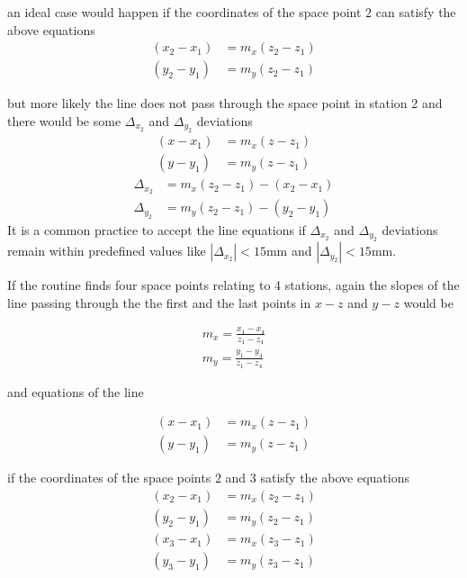 an ideal case would happen if the coordinates of the space
point $2$ can satisfy the above equations
\begin{equation}
\begin{split}
(x_{2}-x_{1}) &=m_{x}(z_{2}-z_{1})\\
(y_{2}-y_{1}) &=m_{y}(z_{2}-z_{1})
\end{split}
\end{equation}

but more likely the line does not pass through the space point in station 2
and there would be some $\Delta_{x_2}$ and $\Delta_{y_2}$ deviations
\begin{equation}
\begin{split}
(x-x_{1}) &=m_{x}(z-z_{1})\\
(y-y_{1}) &=m_{y}(z-z_{1})
\end{split}
\end{equation}
\begin{equation}
\begin{split}
\Delta_{x_2} &=m_{x}(z_{2}-z_{1})-(x_{2}-x_{1})\\
\Delta_{y_2} &=m_{y}(z_{2}-z_{1})-(y_{2}-y_{1})
\end{split}
\end{equation}
It is a common practice to accept the line equations if
$\Delta_{x_2}$ and $\Delta_{y_2}$ deviations  remain within  
 predefined values like 
$|\Delta_{x_2}|< 15 \text{mm}$  and  $|\Delta_{y_2}|<15 \text{mm}$.
 
If the routine finds four space points relating to 4 stations,
again the slopes of the line passing through the 
the first and the last points in $x-z$ and $y-z$ would be

\begin{equation}
\begin{split}
m_x=\frac{x_{1}-x_{4}}{z_{1}-z_{4}}\\
m_y=\frac{y_{1}-y_{4}}{z_{1}-z_{4}}
\end{split}
\end{equation}

 and equations of the line

\begin{equation}
\begin{split}
(x-x_{1}) &=m_{x}(z-z_{1})\\
(y-y_{1}) &=m_{y}(z-z_{1})
\end{split}
\end{equation}

if the coordinates of the space points $2$ and $3$ satisfy the above
equations
\begin{equation}
\begin{split}
(x_{2}-x_{1}) &=m_{x}(z_{2}-z_{1})\\
(y_{2}-y_{1}) &=m_{y}(z_{2}-z_{1})\\
(x_{3}-x_{1}) &=m_{x}(z_{3}-z_{1})\\
(y_{3}-y_{1}) &=m_{y}(z_{3}-z_{1})
\end{split}
\end{equation}

